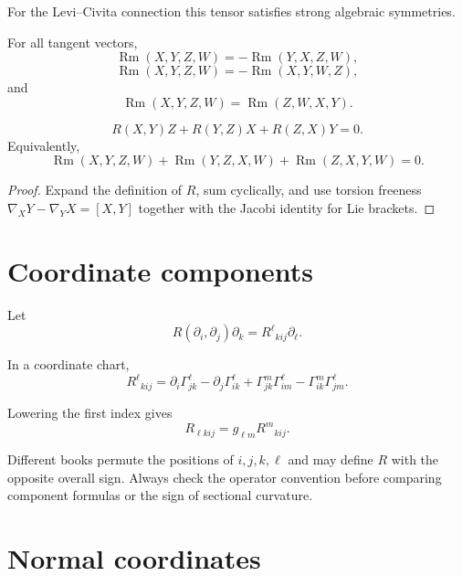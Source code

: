 For the Levi--Civita connection this tensor satisfies strong algebraic symmetries.

\begin{theorem}\label{thm:vii26-symmetries}
For all tangent vectors,
\[
\operatorname{Rm}(X,Y,Z,W)
=
-\operatorname{Rm}(Y,X,Z,W),
\]
\[
\operatorname{Rm}(X,Y,Z,W)
=
-\operatorname{Rm}(X,Y,W,Z),
\]
and
\[
\operatorname{Rm}(X,Y,Z,W)
=
\operatorname{Rm}(Z,W,X,Y).
\]
\end{theorem}

\begin{theorem}\label{thm:vii26-bianchi1}
\[
R(X,Y)Z+R(Y,Z)X+R(Z,X)Y=0.
\]
Equivalently,
\[
\operatorname{Rm}(X,Y,Z,W)
+
\operatorname{Rm}(Y,Z,X,W)
+
\operatorname{Rm}(Z,X,Y,W)=0.
\]
\end{theorem}

\begin{proof}
Expand the definition of \(R\), sum cyclically, and use torsion freeness
\(\nabla_XY-\nabla_YX=[X,Y]\) together with the Jacobi identity for Lie brackets.
\end{proof}

\section{Coordinate components}

Let
\[
R(\partial_i,\partial_j)\partial_k
=
R^\ell{}_{kij}\partial_\ell.
\]

\begin{theorem}\label{thm:vii26-components}
In a coordinate chart,
\[
R^\ell{}_{kij}
=
\partial_i\Gamma^\ell_{jk}
-\partial_j\Gamma^\ell_{ik}
+\Gamma^m_{jk}\Gamma^\ell_{im}
-\Gamma^m_{ik}\Gamma^\ell_{jm}.
\]
\end{theorem}

Lowering the first index gives
\[
R_{\ell kij}
=
g_{\ell m}R^m{}_{kij}.
\]

\begin{warning}\label{warn:vii26-index}
Different books permute the positions of \(i,j,k,\ell\) and may define \(R\) with
the opposite overall sign.  Always check the operator convention before comparing
component formulas or the sign of sectional curvature.
\end{warning}

\section{Normal coordinates}

